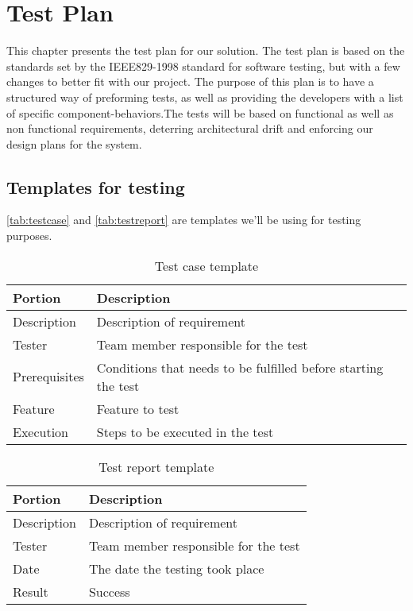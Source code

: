 \chapter{Test Plan}
This chapter presents the test plan for our solution. The test plan is based on
the standards set by the IEEE829-1998 standard for software testing, but with a
few changes to better fit with our project. The purpose of this plan is to have
a structured way of preforming tests, as well as providing the developers with
a list of specific component-behaviors.The tests will be based on functional as
well as non functional requirements, deterring architectural drift and
enforcing our design plans for the system.

\section{Templates for testing}
\autoref{tab:testcase} and \autoref{tab:testreport} are templates we'll be
using for testing purposes.

\begin{table}[ht] \small \center
\caption{Test case template \label{tab:testcase}}
\begin{tabular}{l l}
	\toprule
	Portion & Description \\
	\midrule
	Description & Description of requirement \\
	Tester & Team member responsible for the test \\
	Prerequisites & Conditions that needs to be fulfilled before starting the test \\
	Feature & Feature to test \\
	Execution & Steps to be executed in the test \\
	\bottomrule
\end{tabular}
\end{table}

\begin{table}[ht] \small \center
\caption{Test report template \label{tab:testreport}}
\begin{tabular}{l l}
	\toprule
	Portion & Description \\
	\midrule
	Description & Description of requirement \\
	Tester & Team member responsible for the test \\
	Date & The date the testing took place \\
	Result & Success \\
	\bottomrule
\end{tabular}
\end{table}

